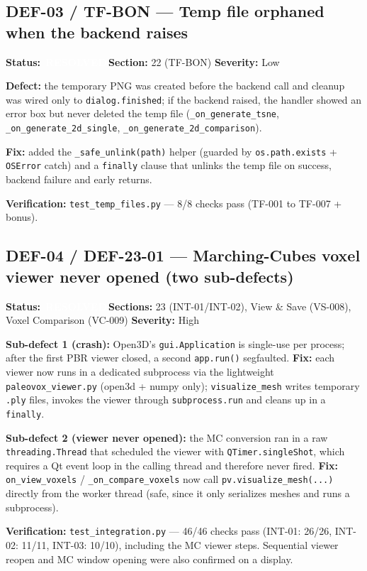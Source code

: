 \documentclass[12pt,a4paper]{article}
\newcommand{\statusresolved}{\colorbox{statusorange}{\textcolor{white}{\textbf{\,RESOLVED\,}}}}
\begin{document}
\subsection{DEF-03 / TF-BON --- Temp file orphaned when the backend raises}
\textbf{Status:} \statusresolved \quad \textbf{Section:} 22 (TF-BON) \quad
\textbf{Severity:} Low

\textbf{Defect:} the temporary PNG was created before the backend call and
cleanup was wired only to \texttt{dialog.finished}; if the backend raised, the
handler showed an error box but never deleted the temp file
(\texttt{\_on\_generate\_tsne}, \texttt{\_on\_generate\_2d\_single},
\texttt{\_on\_generate\_2d\_comparison}).

\textbf{Fix:} added the \texttt{\_safe\_unlink(path)} helper (guarded by
\texttt{os.path.exists} + \texttt{OSError} catch) and a \texttt{finally} clause
that unlinks the temp file on success, backend failure and early returns.

\textbf{Verification:} \texttt{test\_temp\_files.py} --- 8/8 checks pass
(TF-001 to TF-007 + bonus).

\subsection{DEF-04 / DEF-23-01 --- Marching-Cubes voxel viewer never opened (two sub-defects)}
\textbf{Status:} \statusresolved \quad \textbf{Sections:} 23 (INT-01/INT-02),
View \& Save (VS-008), Voxel Comparison (VC-009) \quad \textbf{Severity:} High

\textbf{Sub-defect 1 (crash):} Open3D's \texttt{gui.Application} is single-use
per process; after the first PBR viewer closed, a second \texttt{app.run()}
segfaulted. \textbf{Fix:} each viewer now runs in a dedicated subprocess via the
lightweight \texttt{paleovox\_viewer.py} (open3d + numpy only);
\texttt{visualize\_mesh} writes temporary \texttt{.ply} files, invokes the viewer
through \texttt{subprocess.run} and cleans up in a \texttt{finally}.

\textbf{Sub-defect 2 (viewer never opened):} the MC conversion ran in a raw
\texttt{threading.Thread} that scheduled the viewer with
\texttt{QTimer.singleShot}, which requires a Qt event loop in the calling thread
and therefore never fired. \textbf{Fix:} \texttt{on\_view\_voxels} /
\texttt{\_on\_compare\_voxels} now call \texttt{pv.visualize\_mesh(...)} directly
from the worker thread (safe, since it only serializes meshes and runs a
subprocess).

\textbf{Verification:} \texttt{test\_integration.py} --- 46/46 checks pass
(INT-01: 26/26, INT-02: 11/11, INT-03: 10/10), including the MC viewer steps.
Sequential viewer reopen and MC window opening were also confirmed on a display.
\end{document}
